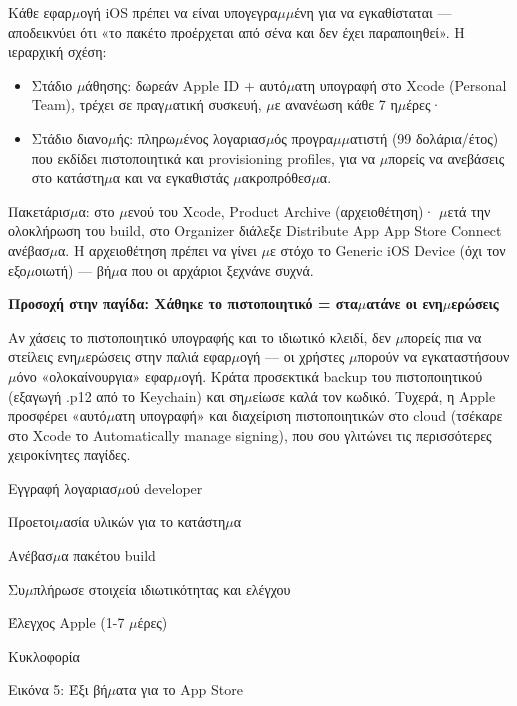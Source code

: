Κάθε εφαρ$\mu$ογή iOS πρέπει να είναι υπογεγρα$\mu$$\mu$ένη για να εγκαθίσταται — αποδεικνύει ότι «το πακέτο προέρχεται από σένα και δεν έχει παραποιηθεί». Η ιεραρχική σχέση:

\begin{itemize}
  \item Στάδιο $\mu$άθησης: δωρεάν Apple ID + αυτό$\mu$ατη υπογραφή στο Xcode (Personal Team), τρέχει σε πραγ$\mu$ατική συσκευή, $\mu$ε ανανέωση κάθε 7 η$\mu$έρες·
  \item Στάδιο διανο$\mu$ής: πληρω$\mu$ένος λογαριασ$\mu$ός προγρα$\mu$$\mu$ατιστή (99 δολάρια/έτος) που εκδίδει πιστοποιητικά και provisioning profiles, για να $\mu$πορείς να ανεβάσεις στο κατάστη$\mu$α και να εγκαθιστάς $\mu$ακροπρόθεσ$\mu$α.
\end{itemize}

Πακετάρισ$\mu$α: στο $\mu$ενού του Xcode, Product Archive (αρχειοθέτηση)· $\mu$ετά την ολοκλήρωση του build, στο Organizer διάλεξε Distribute App App Store Connect ανέβασ$\mu$α. Η αρχειοθέτηση πρέπει να γίνει $\mu$ε στόχο το Generic iOS Device (όχι τον εξο$\mu$οιωτή) — βή$\mu$α που οι αρχάριοι ξεχνάνε συχνά.

\textbf{Προσοχή στην παγίδα: Χάθηκε το πιστοποιητικό = στα$\mu$ατάνε οι ενη$\mu$ερώσεις}\par

Αν χάσεις το πιστοποιητικό υπογραφής και το ιδιωτικό κλειδί, δεν $\mu$πορείς πια να στείλεις ενη$\mu$ερώσεις στην παλιά εφαρ$\mu$ογή — οι χρήστες $\mu$πορούν να εγκαταστήσουν $\mu$όνο «ολοκαίνουργια» εφαρ$\mu$ογή. Κράτα προσεκτικά backup του πιστοποιητικού (εξαγωγή .p12 από το Keychain) και ση$\mu$είωσε καλά τον κωδικό. Τυχερά, η Apple προσφέρει «αυτό$\mu$ατη υπογραφή» και διαχείριση πιστοποιητικών στο cloud (τσέκαρε στο Xcode το Automatically manage signing), που σου γλιτώνει τις περισσότερες χειροκίνητες παγίδες.


Εγγραφή λογαριασ$\mu$ού developer

Προετοι$\mu$ασία υλικών για το κατάστη$\mu$α

Ανέβασ$\mu$α πακέτου build

Συ$\mu$πλήρωσε στοιχεία ιδιωτικότητας και ελέγχου

Έλεγχος Apple (1-7 $\mu$έρες)

Κυκλοφορία

\begin{center}\small\color{gray}Εικόνα 5: Έξι βή$\mu$ατα για το App Store\end{center}

